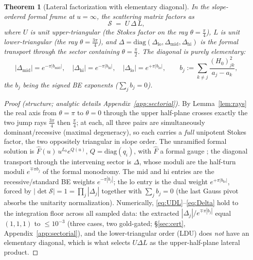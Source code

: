 \documentclass[11pt]{article}
\newtheorem{theorem}{Theorem}
\theoremstyle{definition}
\theoremstyle{remark}
\newcommand{\diag}{\mathrm{diag}}
\newcommand{\Scat}{\mathcal{S}}
\newcommand{\lo}{\mathrm{lo}}
\newcommand{\mi}{\mathrm{mid}}
\newcommand{\hi}{\mathrm{hi}}
\begin{document}
\begin{theorem}[Lateral factorization with elementary diagonal]\label{thm:factor}
In the slope-ordered formal frame at $u=\infty$, the scattering matrix factors as
\begin{equation}\label{eq:UDL}
\Scat \;=\; U\,\Delta\,L,
\end{equation}
where $U$ is unit upper-triangular (the Stokes factor on the ray $\theta=\tfrac\pi4$), $L$ is
unit lower-triangular (the ray $\theta=\tfrac{3\pi}4$), and $\Delta=\diag(\Delta_\lo,\Delta_\mi,\Delta_\hi)$
is the formal transport through the sector containing $\theta=\tfrac\pi2$. The diagonal is
\emph{purely elementary}:
\begin{equation}\label{eq:Delta}
|\Delta_\mi|=e^{-\pi|b_\mi|},\quad |\Delta_\hi|=e^{-\pi|b_\hi|},\quad
|\Delta_\lo|=e^{+\pi|b_\lo|},\qquad
b_j:=\sum_{k\neq j}\frac{(H_0)_{jk}^2}{a_j-a_k},
\end{equation}
the $b_j$ being the signed BE exponents ($\sum_j b_j=0$).
\end{theorem}

\begin{proof}[Proof (structure; analytic details Appendix~\ref{app:sectorial})]
By Lemma~\ref{lem:rays} the real axis from $\theta=\pi$ to $\theta=0$ through the upper
half-plane crosses exactly the two jump rays $\tfrac{3\pi}4$ then $\tfrac\pi4$; at each, all
three pairs are simultaneously dominant/recessive (maximal degeneracy), so each carries a
\emph{full} unipotent Stokes factor, the two oppositely triangular in slope order. The
unramified formal solution is $\hat F(u)\,u^{L_0}e^{Q(u)}$, $Q=\diag(q_i)$, with $\hat F$ a
formal gauge \cite{Wasow1965,LR2016}; the diagonal transport through the intervening sector
is $\Delta$, whose moduli are the half-turn moduli $e^{\mp\pi b_j}$ of the formal monodromy.
The mid and hi entries are the recessive/standard BE weights $e^{-\pi|b_j|}$; the lo entry is
the dual weight $e^{+\pi|b_\lo|}$, forced by $|\det\Scat|=1=\prod_j|\Delta_j|$ together with
$\sum_jb_j=0$ (the last Gauss pivot absorbs the unitarity normalization). Numerically,
\eqref{eq:UDL}--\eqref{eq:Delta} hold to the integration floor across all sampled data: the
extracted $|\Delta_j|/e^{\mp\pi|b_j|}$ equal $(1,1,1)$ to $\le 10^{-3}$ (three cases, two
gold-gated; \S\ref{sec:cert}, Appendix~\ref{app:sectorial}), and the lower-triangular order
(LDU) does \emph{not} have an elementary diagonal, which is what selects $U\Delta L$ as the
upper-half-plane lateral product.
\end{proof}
\end{document}
